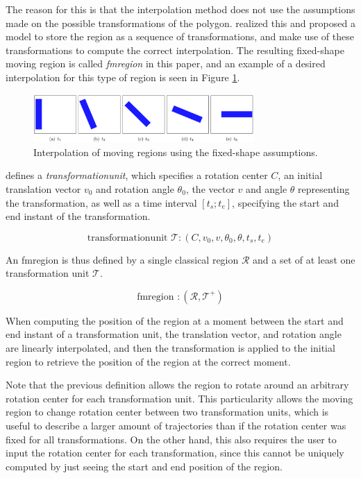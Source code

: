The reason for this is that the interpolation method does not use the assumptions made on the possible transformations of the polygon. \cite{fmregion} realized this and proposed a model to store the region as a sequence of transformations, and make use of these transformations to compute the correct interpolation. The resulting fixed-shape moving region is called \textit{fmregion} in this paper, and an example of a desired interpolation for this type of region is seen in Figure \ref{fig:fixed_shape_interpolation}.

\begin{figure}[h!]
    \centering
    \includegraphics[width=0.75\textwidth]{images/fixed_shape_interpolation.png}
    \caption{Interpolation of moving regions using the fixed-shape assumptions. \cite{fmregion}}
    \label{fig:fixed_shape_interpolation}
\end{figure}


\cite{fmregion} defines a \textit{transformationunit}, which specifies a rotation center $C$, an initial translation vector $v_0$ and rotation angle $\theta_0$, the vector $v$ and angle $\theta$ representing the transformation, as well as a time interval $[t_s; t_e]$, specifying the start and end instant of the transformation.

\[
    \text{transformationunit } \mathcal{T}: (C, v_0, v, \theta_0, \theta, t_{s}, t_{e})
\]

An fmregion is thus defined by a single classical region $\mathcal{R}$ and a set of at least one transformation unit $\mathcal{T}$.

\[
    \text{fmregion } : (\mathcal{R}, \mathcal{T}^{+})
\]

When computing the position of the region at a moment between the start and end instant of a transformation unit, the translation vector, and rotation angle are linearly interpolated, and then the transformation is applied to the initial region to retrieve the position of the region at the correct moment.

Note that the previous definition allows the region to rotate around an arbitrary rotation center for each transformation unit. This particularity allows the moving region to change rotation center between two transformation units, which is useful to describe a larger amount of trajectories than if the rotation center was fixed for all transformations. On the other hand, this also requires the user to input the rotation center for each transformation, since this cannot be uniquely computed by just seeing the start and end position of the region.

